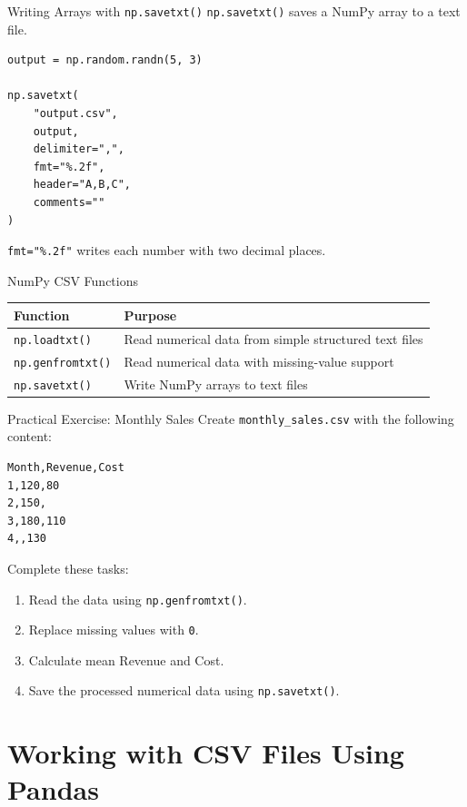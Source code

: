 \documentclass[aspectratio=169,11pt]{beamer}
\newcommand{\code}[1]{\texttt{#1}}
\begin{document}
\begin{frame}[fragile]{Writing Arrays with \code{np.savetxt()}}
\code{np.savetxt()} saves a NumPy array to a text file.

\begin{lstlisting}[style=pythonstyle]
output = np.random.randn(5, 3)

np.savetxt(
    "output.csv",
    output,
    delimiter=",",
    fmt="%.2f",
    header="A,B,C",
    comments=""
)
\end{lstlisting}

\code{fmt="\%.2f"} writes each number with two decimal places.
\end{frame}

\begin{frame}{NumPy CSV Functions}
\begin{tabularx}{\textwidth}{lX}
\toprule
\textbf{Function} & \textbf{Purpose} \\
\midrule
\code{np.loadtxt()} & Read numerical data from simple structured text files \\
\code{np.genfromtxt()} & Read numerical data with missing-value support \\
\code{np.savetxt()} & Write NumPy arrays to text files \\
\bottomrule
\end{tabularx}
\end{frame}

\begin{frame}[fragile]{Practical Exercise: Monthly Sales}
Create \code{monthly\_sales.csv} with the following content:
\begin{lstlisting}[style=textstyle]
Month,Revenue,Cost
1,120,80
2,150,
3,180,110
4,,130
\end{lstlisting}

Complete these tasks:
\begin{enumerate}
  \item Read the data using \code{np.genfromtxt()}.
  \item Replace missing values with \code{0}.
  \item Calculate mean Revenue and Cost.
  \item Save the processed numerical data using \code{np.savetxt()}.
\end{enumerate}
\end{frame}

\section{Working with CSV Files Using Pandas}
\end{document}
